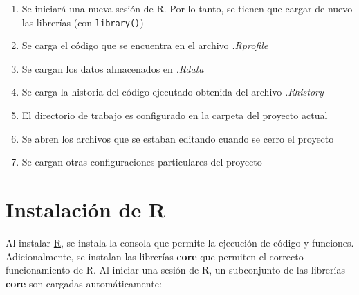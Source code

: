 \documentclass[]{book}
\providecommand{\tightlist}{%
  \setlength{\itemsep}{0pt}\setlength{\parskip}{0pt}}
\begin{document}
\begin{enumerate}
\def\labelenumi{\arabic{enumi}.}
\tightlist
\item
  Se iniciará una nueva sesión de R. Por lo tanto, se tienen que cargar de nuevo las librerías (con \texttt{library()})
\item
  Se carga el código que se encuentra en el archivo \emph{.Rprofile}
\item
  Se cargan los datos almacenados en \emph{.Rdata}
\item
  Se carga la historia del código ejecutado obtenida del archivo \emph{.Rhistory}
\item
  El directorio de trabajo es configurado en la carpeta del proyecto actual
\item
  Se abren los archivos que se estaban editando cuando se cerro el proyecto
\item
  Se cargan otras configuraciones particulares del proyecto
\end{enumerate}

\hypertarget{instalaciuxf3n-de-r}{%
\section{Instalación de R}\label{instalaciuxf3n-de-r}}

Al instalar \href{https://cran.r-project.org}{R}, se instala la consola que permite la ejecución de código y funciones. Adicionalmente, se instalan las librerías \textbf{core} que permiten el correcto funcionamiento de R. Al iniciar una sesión de R, un subconjunto de las librerías \textbf{core} son cargadas automáticamente:
\end{document}
